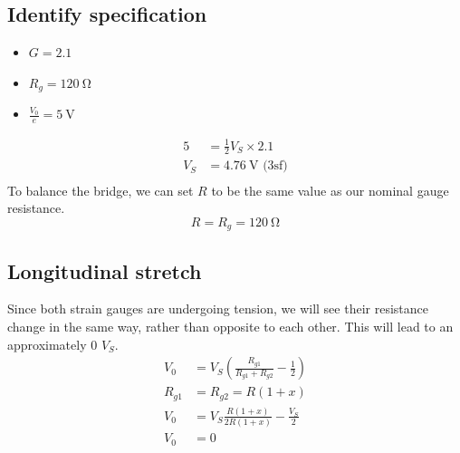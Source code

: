 \documentclass[12pt]{article}
\numberwithin{equation}{section}
\begin{document}
\subsection*{Identify specification}
\begin{itemize}
  \item $G = 2.1$
  \item $R_g = \SI{120}{\ohm}$
  \item $\frac{V_0}{e} = \SI{5}{\volt}$
\end{itemize}
\begin{align}
  5 &= \frac{1}{2} V_S \times 2.1\\
  V_S &= \SI{4.76}{\volt} \textrm{ (3sf)}\\
\end{align}
To balance the bridge, we can set $R$ to be the same value as our nominal gauge resistance.
\begin{equation}
  R = R_g = \SI{120}{\ohm}
\end{equation}
\subsection*{Longitudinal stretch}
Since both strain gauges are undergoing tension, we will see their resistance change in the same way, rather than opposite to each other. This will lead to an approximately 0 $V_S$. 
\begin{align}
  V_0 &= V_S \left( \frac{R_{g1}}{R_{g1} + R_{g2}} - \frac{1}{2} \right)\\
  R_{g1} &= R_{g2} = R(1+x)\\
  V_0 &= V_S\frac{R(1+x)}{2R(1+x)} - \frac{V_S}{2}\\
  V_0 &= 0 
\end{align}
\end{document}
